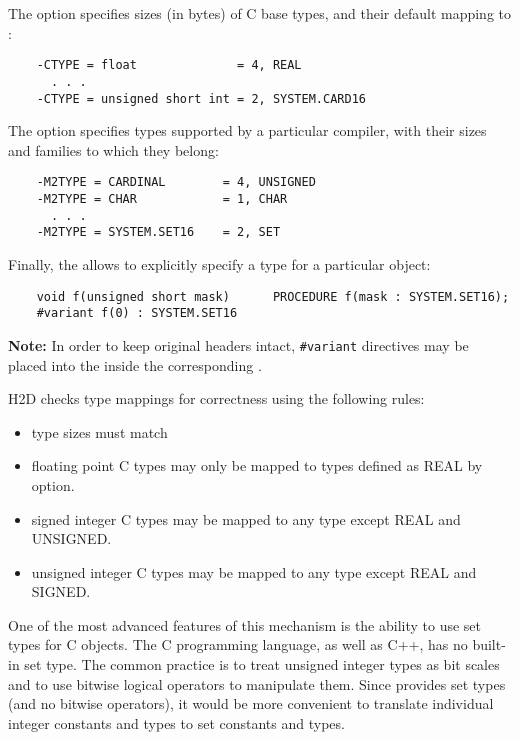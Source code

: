 The  option specifies sizes (in bytes) of C base types,
and their default mapping to \mt{}:

\verb'    -CTYPE = float              = 4, REAL' \\
\verb'      . . .' \\
\verb'    -CTYPE = unsigned short int = 2, SYSTEM.CARD16'

The  option specifies \mt{} types supported by a
particular compiler, with their sizes and families to which they belong:

\verb'    -M2TYPE = CARDINAL        = 4, UNSIGNED' \\
\verb'    -M2TYPE = CHAR            = 1, CHAR' \\
\verb'      . . .' \\
\verb'    -M2TYPE = SYSTEM.SET16    = 2, SET'

Finally, the  allows to explicitly specify a \mt{} type for
a particular object:

{\small
\verb'    void f(unsigned short mask)      PROCEDURE f(mask : SYSTEM.SET16);' \\
\verb'    #variant f(0) : SYSTEM.SET16'
} %

{\bf Note:} In order to keep original headers intact, {\tt \#variant}
directives may be placed into the \ProjectFile{} inside the corresponding
.

H2D checks type mappings for correctness using the following rules:
\begin{itemize}
\item type sizes must match
\item floating point C types may only be mapped to \mt{} types defined as REAL
      by  option.
\item signed integer C types may be mapped to any \mt{} type except REAL and UNSIGNED.
\item unsigned integer C types may be mapped to any \mt{} type except REAL and SIGNED.
\end{itemize}

One of the most advanced features of this mechanism is the ability
to use \mt{} set types for C objects.
The C programming language, as well as C++, has no built-in set type.
The common practice is to treat unsigned integer types as bit scales
and to use bitwise logical operators to manipulate them. Since \mt{}
provides set types (and no bitwise operators), it would be more convenient to
translate individual integer constants and types to set constants and types.

